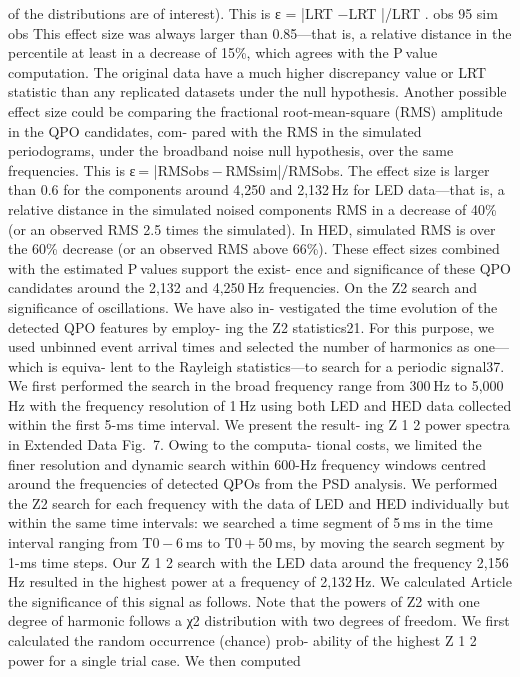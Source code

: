 of the distributions are of interest). This is ε = |LRT
−LRT
|/LRT
.
obs
95
sim
obs
This effect size was always larger than 0.85—that is, a relative distance in
the percentile at least in a decrease of 15\%, which agrees with the P value
computation. The original data have a much higher discrepancy value or
LRT statistic than any replicated datasets under the null hypothesis.
Another possible effect size could be comparing the fractional
root-mean-square (RMS) amplitude in the QPO candidates, com-
pared with the RMS in the simulated periodograms, under the
broadband noise null hypothesis, over the same frequencies. This is
ε = |RMSobs − RMSsim|/RMSobs. The effect size is larger than 0.6 for the
components around 4,250 and 2,132 Hz for LED data—that is, a relative
distance in the simulated noised components RMS in a decrease of
40\% (or an observed RMS 2.5 times the simulated). In HED, simulated
RMS is over the 60\% decrease (or an observed RMS above 66\%). These
effect sizes combined with the estimated P values support the exist-
ence and significance of these QPO candidates around the 2,132 and
4,250 Hz frequencies.
On the Z2 search and significance of oscillations. We have also in-
vestigated the time evolution of the detected QPO features by employ-
ing the Z2 statistics21. For this purpose, we used unbinned event arrival
times and selected the number of harmonics as one—which is equiva-
lent to the Rayleigh statistics—to search for a periodic signal37. We first
performed the search in the broad frequency range from 300 Hz to
5,000 Hz with the frequency resolution of 1 Hz using both LED and HED
data collected within the first 5-ms time interval. We present the result-
ing Z 1
2 power spectra in Extended Data Fig. 7. Owing to the computa-
tional costs, we limited the finer resolution and dynamic search within
600-Hz frequency windows centred around the frequencies of
detected QPOs from the PSD analysis. We performed the Z2 search for
each frequency with the data of LED and HED individually but within
the same time intervals: we searched a time segment of 5 ms in the time
interval ranging from T0 − 6 ms to T0 + 50 ms, by moving the search
segment by 1-ms time steps.
Our Z 1
2 search with the LED data around the frequency 2,156 Hz
resulted in the highest power at a frequency of 2,132 Hz. We calculated
Article
the significance of this signal as follows. Note that the powers of Z2 with
one degree of harmonic follows a χ2 distribution with two degrees of
freedom. We first calculated the random occurrence (chance) prob-
ability of the highest Z 1
2 power for a single trial case. We then computed
